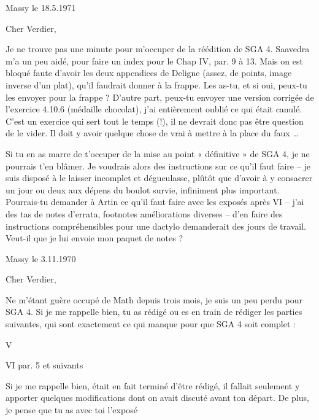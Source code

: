 \documentclass[11pt,a4paper]{article}
\begin{document}

Massy le 18.5.1971

Cher Verdier,

Je ne trouve pas une minute pour m'occuper de la réédition de SGA 4. Saavedra
m'a un peu aidé, pour faire un index pour le Chap IV, par. 9 à 13. Mais on est
bloqué faute d'avoir les deux appendices de Deligne (assez, de points, image
inverse d'un plat), qu'il faudrait donner à la frappe. Les as-tu, et si oui,
peux-tu les envoyer pour la frappe ? D'autre part, peux-tu envoyer une version
corrigée de l'exercice 4.10.6 (médaille chocolat), j'ai entièrement oublié ce
qui était canulé. C'est un exercice qui sert tout le temps (!), il ne devrait
donc pas être question de le vider. Il doit y avoir quelque chose de vrai à
mettre à la place du faux \ldots

Si tu en as marre de t'occuper de la mise au point « définitive » de SGA 4, je
ne pourrais t'en blâmer. Je voudrais alors des instructions sur ce qu'il faut
faire -- je suis disposé à le laisser incomplet et dégueulasse, plûtôt que
d'avoir à y consacrer un jour ou deux aux dépens du boulot survie, infiniment
plus important. Pourrais-tu demander à Artin ce qu'il faut faire avec les
exposés après VI -- j'ai des tas de notes d'errata, footnotes améliorations
diverses -- d'en faire des instructions compréhensibles pour une dactylo
demanderait des jours de travail. Veut-il que je lui envoie mon paquet de
notes ?


Massy le 3.11.1970

Cher Verdier,

Ne m'étant guère occupé de Math depuis trois mois, je suis un peu perdu pour
SGA 4. Si je me rappelle bien, tu as rédigé ou es en train de rédiger les
parties suivantes, qui sont exactement ce qui manque pour que SGA 4 soit
complet :


V

VI par. 5 et suivants

Si je me rappelle bien,  était en fait terminé d'être rédigé, il fallait seulement y
apporter quelques modifications dont on avait discuté avant ton départ. De
plus, je pense que tu as avec toi l'exposé
\end{document}
